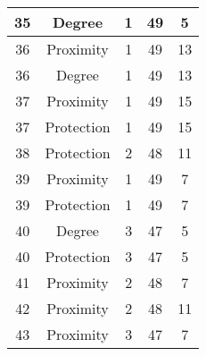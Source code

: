 \documentclass[results.tex]{subfiles}
\begin{document}
\begin{center}
\begin{tabular}{| c || c | c | c | c |}
            \hline
            35                      & Degree                       & 1                      & 49                      & 5                    \\
            \hline
            36                      & Proximity                    & 1                      & 49                      & 13                   \\
            \hline
            36                      & Degree                       & 1                      & 49                      & 13                   \\
            \hline
            37                      & Proximity                    & 1                      & 49                      & 15                   \\
            \hline
            37                      & Protection                   & 1                      & 49                      & 15                   \\
            \hline
            38                      & Protection                   & 2                      & 48                      & 11                   \\
            \hline
            39                      & Proximity                    & 1                      & 49                      & 7                    \\
            \hline
            39                      & Protection                   & 1                      & 49                      & 7                    \\
            \hline
            40                      & Degree                       & 3                      & 47                      & 5                    \\
            \hline
            40                      & Protection                   & 3                      & 47                      & 5                    \\
            \hline
            41                      & Proximity                    & 2                      & 48                      & 7                    \\
            \hline
            42                      & Proximity                    & 2                      & 48                      & 11                   \\
            \hline
            43                      & Proximity                    & 3                      & 47                      & 7                    \\

\end{tabular}
\end{center}
\end{document}
